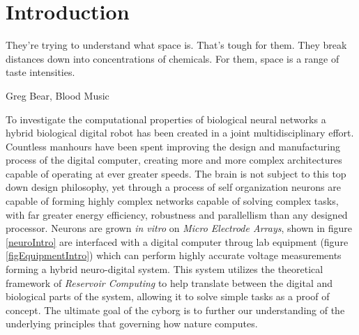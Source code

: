 \chapter{Introduction}
\epigraph{They're trying to understand what space is. That's tough for them.
They break distances down into concentrations of chemicals. For them, space is a
range of taste intensities.}{Greg Bear, Blood Music}
%
To investigate the computational properties of biological neural networks a
hybrid biological digital robot has been created in a joint multidisciplinary
effort. 
Countless manhours have been spent improving the design and manufacturing
process of the digital computer, creating more and more complex architectures
capable of operating at ever greater speeds.
%
The brain is not subject to this top down design philosophy, yet through a
process of self organization neurons are capable of forming highly complex
networks capable of solving complex tasks, with far greater energy efficiency,
robustness and parallellism than any designed processor.
%
%
Neurons are grown \emph{in vitro} on \emph{Micro Electrode Arrays}, shown in
figure \ref{neuroIntro}
are interfaced with a digital computer throug lab equipment (figure \ref{figEquipmentIntro})
which can perform highly accurate voltage measurements forming a hybrid neuro-digital system.
%
This system utilizes the theoretical framework of \emph{Reservoir Computing} to
help translate between the digital and biological parts of the system, allowing
it to solve simple tasks as a proof of concept.
%
The ultimate goal of the cyborg is to further our understanding of the
underlying principles that governing how nature computes.
%
%
